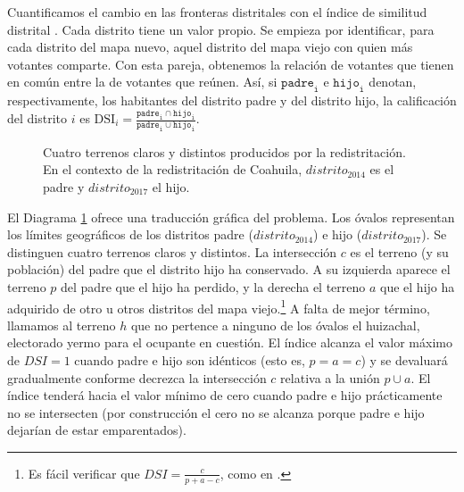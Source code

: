 \documentclass[letter,12pt]{article}
\begin{document}
Cuantificamos el cambio en las fronteras distritales con el índice de similitud distrital \citep[DSI por sus siglas en inglés,][]{cox.katz.2002}. Cada distrito tiene un valor propio. Se empieza por identificar, para cada distrito del mapa nuevo, aquel distrito del mapa viejo con quien más votantes comparte. Con esta pareja, obtenemos la relación de votantes que tienen en común entre la de votantes que reúnen. Así, si $\texttt{padre}_\texttt{i}$ e $\texttt{hijo}_\texttt{i}$ denotan, respectivamente, los habitantes del distrito padre y del distrito hijo, la calificación del distrito $i$ es $\text{DSI}_i = \frac{\texttt{padre}_\texttt{i} \cap \texttt{hijo}_\texttt{i}}{\texttt{padre}_\texttt{i} \cup \texttt{hijo}_\texttt{i}}$.

\begin{figure}
  \centering
    \usetikzlibrary{calc}
    \caption{Cuatro terrenos claros y distintos producidos por la redistritación. En el contexto de la redistritación de Coahuila, $distrito_{2014}$ es el padre y $distrito_{2017}$ el hijo.}\label{F:venn}
\end{figure}

El Diagrama \ref{F:venn} ofrece una traducción gráfica del problema. Los óvalos representan los límites geográficos de los distritos padre ($distrito_{2014}$) e hijo ($distrito_{2017}$). Se distinguen cuatro terrenos claros y distintos. La intersección $c$ es el terreno (y su población) del padre que el distrito hijo ha conservado. A su izquierda aparece el terreno $p$ del padre que el hijo ha perdido, y la derecha el terreno $a$ que el hijo ha adquirido de otro u otros distritos del mapa viejo.\footnote{Es fácil verificar que $DSI = \frac{c}{p+a-c}$, como en \citet{cox.katz.2002}.} A falta de mejor término, llamamos al terreno $h$ que no pertence a ninguno de los óvalos el huizachal, electorado yermo para el ocupante en cuestión. El índice alcanza el valor máximo de $DSI=1$  cuando padre e hijo son idénticos (esto es, $p=a=c$) y se devaluará gradualmente conforme decrezca la intersección $c$ relativa a la unión $p \cup a$. El índice tenderá hacia el valor mínimo de cero cuando padre e hijo prácticamente no se intersecten (por construcción el cero no se alcanza porque padre e hijo dejarían de estar emparentados). 
\end{document}
